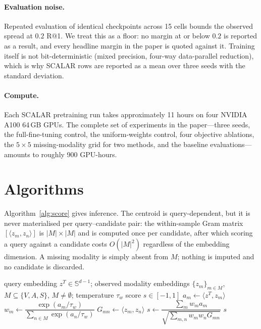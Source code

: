 \documentclass[10pt,twocolumn,letterpaper]{article}
\newcommand{\ours}{SCALAR}
\begin{document}
\paragraph{Evaluation noise.}
Repeated evaluation of identical checkpoints across 15 cells bounds the
observed spread at $0.2$ R@1. We treat this as a floor: no margin at or below
$0.2$ is reported as a result, and every headline margin in the paper is quoted
against it. Training itself is not bit-deterministic (mixed precision, four-way
data-parallel reduction), which is why \ours{} rows are reported as a mean over
three seeds with the standard deviation.

\paragraph{Compute.}
Each \ours{} pretraining run takes approximately 11 hours on four NVIDIA A100
64\,GB GPUs. The complete set of experiments in the paper---three seeds, the
full-fine-tuning control, the uniform-weights control, four objective
ablations, the $5\times5$ missing-modality grid for two methods, and the
baseline evaluations---amounts to roughly 900 GPU-hours.

\section{Algorithms}
\label{sec:algo}

Algorithm~\ref{alg:score} gives inference. The centroid is query-dependent, but
it is never materialised per query--candidate pair: the within-sample Gram
matrix $[\langle z_m, z_n\rangle]$ is $|M|\times|M|$ and is computed once per
candidate, after which scoring a query against a candidate costs $O(|M|^2)$
regardless of the embedding dimension. A missing modality is simply absent from
$M$; nothing is imputed and no candidate is discarded.

\begin{algorithm}[t]
\caption{\ours{} scoring for one query--candidate pair}
\label{alg:score}
\begin{algorithmic}[1]
\Require query embedding $z^T\!\in\!\mathbb{S}^{d-1}$; observed modality
         embeddings $\{z_m\}_{m\in M}$, $M\subseteq\{V,A,S\}$, $M\neq\emptyset$;
         temperature $\tau_w$
\Ensure  score $s\in[-1,1]$
\State $a_m \gets \langle z^T\!, z_m\rangle$ 
\State $w_m \gets \dfrac{\exp(a_m/\tau_w)}{\sum_{n\in M}\exp(a_n/\tau_w)}$
\State $G_{mn} \gets \langle z_m, z_n\rangle$ 
\State $s \gets \dfrac{\sum_{m} w_m a_m}
                     {\sqrt{\sum_{m,n} w_m w_n G_{mn}}}$
\State \Return $s$
\end{algorithmic}
\end{algorithm}
\end{document}
